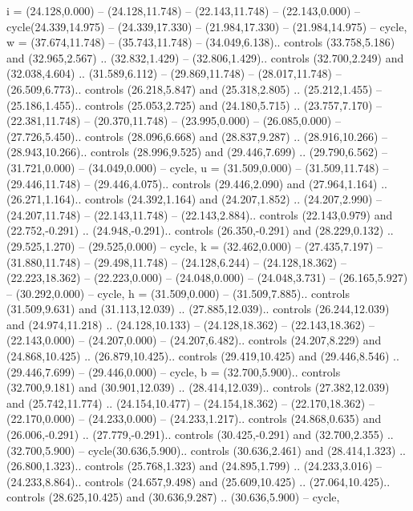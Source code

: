 {i} = {(24.128,0.000) -- (24.128,11.748) -- (22.143,11.748) -- (22.143,0.000) -- cycle(24.339,14.975) -- (24.339,17.330) -- (21.984,17.330) -- (21.984,14.975) -- cycle},
{w} = {(37.674,11.748) -- (35.743,11.748) -- (34.049,6.138).. controls (33.758,5.186) and (32.965,2.567) .. (32.832,1.429) -- (32.806,1.429).. controls (32.700,2.249) and (32.038,4.604) .. (31.589,6.112) -- (29.869,11.748) -- (28.017,11.748) -- (26.509,6.773).. controls (26.218,5.847) and (25.318,2.805) .. (25.212,1.455) -- (25.186,1.455).. controls (25.053,2.725) and (24.180,5.715) .. (23.757,7.170) -- (22.381,11.748) -- (20.370,11.748) -- (23.995,0.000) -- (26.085,0.000) -- (27.726,5.450).. controls (28.096,6.668) and (28.837,9.287) .. (28.916,10.266) -- (28.943,10.266).. controls (28.996,9.525) and (29.446,7.699) .. (29.790,6.562) -- (31.721,0.000) -- (34.049,0.000) -- cycle},
{u} = {(31.509,0.000) -- (31.509,11.748) -- (29.446,11.748) -- (29.446,4.075).. controls (29.446,2.090) and (27.964,1.164) .. (26.271,1.164).. controls (24.392,1.164) and (24.207,1.852) .. (24.207,2.990) -- (24.207,11.748) -- (22.143,11.748) -- (22.143,2.884).. controls (22.143,0.979) and (22.752,-0.291) .. (24.948,-0.291).. controls (26.350,-0.291) and (28.229,0.132) .. (29.525,1.270) -- (29.525,0.000) -- cycle},
{k} = {(32.462,0.000) -- (27.435,7.197) -- (31.880,11.748) -- (29.498,11.748) -- (24.128,6.244) -- (24.128,18.362) -- (22.223,18.362) -- (22.223,0.000) -- (24.048,0.000) -- (24.048,3.731) -- (26.165,5.927) -- (30.292,0.000) -- cycle},
{h} = {(31.509,0.000) -- (31.509,7.885).. controls (31.509,9.631) and (31.113,12.039) .. (27.885,12.039).. controls (26.244,12.039) and (24.974,11.218) .. (24.128,10.133) -- (24.128,18.362) -- (22.143,18.362) -- (22.143,0.000) -- (24.207,0.000) -- (24.207,6.482).. controls (24.207,8.229) and (24.868,10.425) .. (26.879,10.425).. controls (29.419,10.425) and (29.446,8.546) .. (29.446,7.699) -- (29.446,0.000) -- cycle},
{b} = {(32.700,5.900).. controls (32.700,9.181) and (30.901,12.039) .. (28.414,12.039).. controls (27.382,12.039) and (25.742,11.774) .. (24.154,10.477) -- (24.154,18.362) -- (22.170,18.362) -- (22.170,0.000) -- (24.233,0.000) -- (24.233,1.217).. controls (24.868,0.635) and (26.006,-0.291) .. (27.779,-0.291).. controls (30.425,-0.291) and (32.700,2.355) .. (32.700,5.900) -- cycle(30.636,5.900).. controls (30.636,2.461) and (28.414,1.323) .. (26.800,1.323).. controls (25.768,1.323) and (24.895,1.799) .. (24.233,3.016) -- (24.233,8.864).. controls (24.657,9.498) and (25.609,10.425) .. (27.064,10.425).. controls (28.625,10.425) and (30.636,9.287) .. (30.636,5.900) -- cycle},
